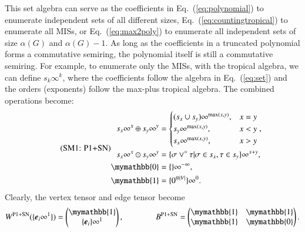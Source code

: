 \documentclass[onefignum, onetabnum]{siamart190516}
\newcommand{\eqname}[1]{\stepcounter{equation}\tag{\theequation : #1}}
\newcommand{\<}{\langle}
\renewcommand{\>}{\rangle}
\newcommand{\Eq}[1]{Eq.~(\ref{#1})}
\newcounter{example}
\begin{document}
This set algebra can serve as the coefficients in \Eq{eq:polynomial} to enumerate independent sets of all different sizes, \Eq{eq:countingtropical} to enumerate all MISs,
or \Eq{eq:max2poly} to enumerate all independent sets of size $\alpha(G)$ and $\alpha(G)-1$.
As long as the coefficients in a truncated polynomial forms a commutative semiring, the polynomial itself is still a commutative semiring.
For example, to enumerate only the MISs, with the tropical algebra, we can define $s_{k}\infty^k$,
where the coefficients follow the algebra in \Eq{eq:set} and the orders (exponents) follow the max-plus tropical algebra.
The combined operations become: 
\begin{equation}
\eqname{P1+SN}
\begin{split}
    s_x\infty^x \oplus s_y\infty^y &= \begin{cases}
        (s_x \cup s_y)\infty^{\max(x,y)}, & x = y\\
        s_y\infty^{\max(x,y)}, & x < y\\
        s_x\infty^{\max(x,y)}, & x > y
    \end{cases},\\
    s_x\infty^x \odot s_y\infty^y &= \{\sigma \lor^\circ \tau | \sigma \in s_x, \tau \in s_y\}\infty^{x+y},\\
    \mymathbb{0} &= \{\}\infty^{-\infty},\\
    \mymathbb{1} &= \{0^{\otimes |V|}\}\infty^{0}. \label{eq:countingtropicalset}
\end{split}
\end{equation}
Clearly, the vertex tensor and edge tensor become
\begin{equation}
    W^{\rm P1+SN}(\{\boldsymbol{e}_{i}\infty^1\}) = \left(\begin{matrix}
        \mymathbb{1} \\
        \{\boldsymbol{e}_{i}\}\infty^1
    \end{matrix}\right),   
    \qquad \qquad
        B^{\rm P1+SN} = \left(\begin{matrix}
        \mymathbb{1}  & \mymathbb{1} \\
        \mymathbb{1} & \mymathbb{0}
    \end{matrix}\right).
\end{equation}
\end{document}
